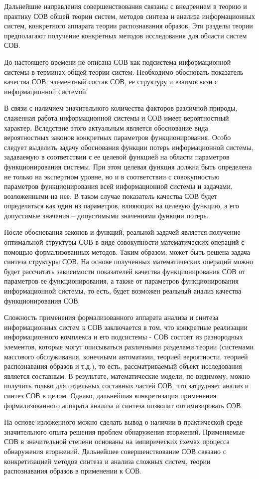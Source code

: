 Дальнейшие направления совершенствования связаны с внедрением в теорию и практику СОВ общей теории систем, методов синтеза и анализа информационных систем, конкретного аппарата теории распознавания образов. Эти разделы теории предполагают получение конкретных методов исследования для области систем СОВ.

До настоящего времени не описана СОВ как подсистема информационной системы в терминах общей теории систем. Необходимо обосновать показатель качества СОВ, элементный состав СОВ, ее структуру и взаимосвязи с информационной системой.

В связи с наличием значительного количества факторов различной природы, слаженная работа информационной системы и СОВ имеет вероятностный характер. Вследствие этого актуальным является обоснование вида вероятностных законов конкретных параметров функционирования. Особо следует выделить задачу обоснования функции потерь информационной системы, задаваемую в соответствии с ее целевой функцией на области параметров функционирования системы. При этом целевая функция должна быть определена не только на экспертном уровне, но и в соответствии с совокупностью параметров функционирования всей информационной системы и задачами, возложенными на нее. В таком случае показатель качества СОВ будет определяться как один из параметров, влияющих на целевую функцию, а его допустимые значения -- допустимыми значениями функции потерь.

После обоснования законов и функций, реальной задачей является получение оптимальной структуры СОВ в виде совокупности математических операций с помощью формализованных методов. Таким образом, может быть решена задача синтеза структуры СОВ. На основе полученных математических операций можно будет рассчитать зависимости показателей качества функционирования СОВ от параметров ее функционирования, а также от параметров функционирования информационной системы, то есть, будет возможен реальный анализ качества функционирования СОВ.

Сложность применения формализованного аппарата анализа и синтеза информационных систем к СОВ заключается в том, что конкретные реализации информационного комплекса и его подсистемы - СОВ состоят из разнородных элементов, которые могут описываться различными разделами теории (системами массового обслуживания, конечными автоматами, теорией вероятности, теорией распознавания образов и т.д.), то есть, рассматриваемый объект исследования является составным. В результате, математические модели, по-видимому, можно получить только для отдельных составных частей СОВ, что затрудняет анализ и синтез СОВ в целом. Однако, дальнейшая конкретизация применения формализованного аппарата анализа и синтеза позволит оптимизировать СОВ.

На основе изложенного можно сделать вывод о наличии в практической среде значительного опыта решения проблем обнаружения вторжений. Применяемые СОВ в значительной степени основаны на эмпирических схемах процесса обнаружения вторжений. Дальнейшее совершенствование СОВ связано с конкретизацией методов синтеза и анализа сложных систем, теории распознавания образов в применении к СОВ.